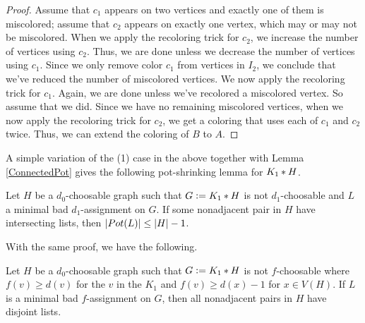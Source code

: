 \begin{proof}
Assume that $c_1$ appears on two vertices and exactly one of them is miscolored;
assume that $c_2$ appears on exactly one vertex, which may or may not be
miscolored.  When we apply the recoloring trick for $c_2$, we increase the
number of vertices using $c_2$.  Thus, we are done unless we decrease the
number of vertices using $c_1$.  Since we only remove color $c_1$ from vertices
in $I_2$, we conclude that we've reduced the number of miscolored vertices.  We
now apply the recoloring trick for $c_1$.  Again, we are done unless we've
recolored a miscolored vertex.  So assume that we did.  Since we have no
remaining miscolored vertices, when we now apply the recoloring trick for
$c_2$, we get a coloring that uses each of $c_1$ and $c_2$ twice.  Thus, we can
extend the coloring of $B$ to $A$.
\end{proof}

A simple variation of the (1) case in the above together with
Lemma \ref{ConnectedPot} gives the following pot-shrinking lemma for
$K_1 \mbox{\hspace{2 pt}$\ast$\hspace{2 pt}} H$.

\begin{lem}\label{NeighborhoodPotShrink}
Let $H$ be a $d_0$-choosable graph such that $G \mathrel{\mathop:}= K_1 \mbox{\hspace{2 pt}$\ast$\hspace{2 pt}} H$ is not
$d_1$-choosable and $L$ a minimal bad $d_1$-assignment on $G$.  If some
nonadjacent pair in $H$ have intersecting lists, then $\left|Pot(L)\right| \leq \left|H\right| - 1$.
\end{lem}
With the same proof, we have the following.

\begin{lem}\label{LowSinglePair}
Let $H$ be a $d_0$-choosable graph such that $G \mathrel{\mathop:}= K_1 \mbox{\hspace{2 pt}$\ast$\hspace{2 pt}} H$ is not
$f$-choosable where $f(v) \geq d(v)$ for the $v$ in the $K_1$ and $f(v) \geq
d(x) - 1$ for $x \in V(H)$. If $L$ is a minimal bad $f$-assignment on $G$, then
all nonadjacent pairs in $H$ have disjoint lists.
\end{lem}

